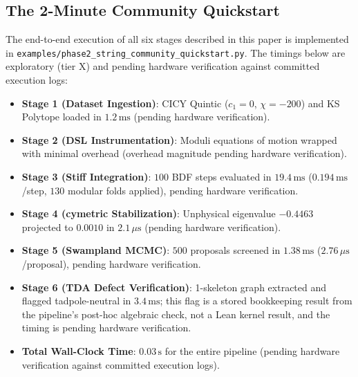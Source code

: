 \documentclass[11pt,a4paper]{article}
\newcommand{\numreconcile}[2]{#1}
\begin{document}
\subsection{The 2-Minute Community Quickstart}
The end-to-end execution of all six stages described in this paper is implemented in \texttt{examples/phase2\_string\_community\_quickstart.py}. The timings below are exploratory (tier X) and pending hardware verification against committed execution logs:
\begin{itemize}
    \item \textbf{Stage 1 (Dataset Ingestion)}: CICY Quintic ($c_1=0$, $\chi = -200$) and KS Polytope loaded in $\numreconcile{1.2}{Stage 1 load time}\,\text{ms}$ (pending hardware verification).
    \item \textbf{Stage 2 (DSL Instrumentation)}: Moduli equations of motion wrapped with minimal overhead (overhead magnitude pending hardware verification).
    \item \textbf{Stage 3 (Stiff Integration)}: $\numreconcile{100}{Stage 3 BDF step count}$ BDF steps evaluated in $\numreconcile{19.4}{Stage 3 total time}\,\text{ms}$ ($\numreconcile{0.194}{Stage 3 per-step time}\,\text{ms}$/step, $\numreconcile{130}{Stage 3 modular fold count}$ modular folds applied), pending hardware verification.
    \item \textbf{Stage 4 (cymetric Stabilization)}: Unphysical eigenvalue $\numreconcile{-0.4463}{Stage 4 unphysical eigenvalue}$ projected to $\numreconcile{0.0010}{Stage 4 projected eigenvalue}$ in $\numreconcile{2.1}{Stage 4 projection time}\,\mu\text{s}$ (pending hardware verification).
    \item \textbf{Stage 5 (Swampland MCMC)}: $\numreconcile{500}{Stage 5 proposal count}$ proposals screened in $\numreconcile{1.38}{Stage 5 total time}\,\text{ms}$ ($\numreconcile{2.76}{Stage 5 per-proposal time}\,\mu\text{s}$/proposal), pending hardware verification.
    \item \textbf{Stage 6 (TDA Defect Verification)}: 1-skeleton graph extracted and flagged tadpole-neutral in $\numreconcile{3.4}{Stage 6 time}\,\text{ms}$; this flag is a stored bookkeeping result from the pipeline's post-hoc algebraic check, not a Lean kernel result, and the timing is pending hardware verification.
    \item \textbf{Total Wall-Clock Time}: $\numreconcile{0.03}{Total pipeline time}\,\text{s}$ for the entire pipeline (pending hardware verification against committed execution logs).
\end{itemize}
\end{document}
